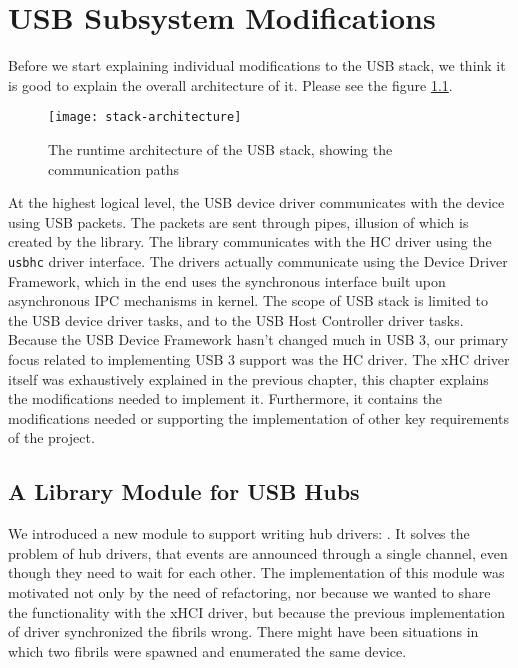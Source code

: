 \chapter{USB Subsystem Modifications}
\label{usb-refactoring}

Before we start explaining individual modifications to the USB stack, we think
it is good to explain the overall architecture of it. Please see the figure
\ref{fig:stack-architecture}.

\begin{figure}[h]
	\centering
	\texttt{[image: stack-architecture]}
	\caption{The runtime architecture of the USB stack, showing the communication paths}
	\label{fig:stack-architecture}
\end{figure}

At the highest logical level, the USB device driver communicates with the
device using USB packets. The packets are sent through pipes, illusion of which
is created by the  library. The library communicates with the HC
driver using the \texttt{usbhc} driver interface. The drivers actually
communicate using the Device Driver Framework, which in the end uses the
synchronous interface built upon asynchronous IPC mechanisms in kernel. The
scope of USB stack is limited to the USB device driver tasks, and to the USB
Host Controller driver tasks. Because the USB Device Framework hasn't changed much
in USB 3, our primary focus related to implementing USB 3 support was the HC
driver. The xHC driver itself was exhaustively explained in the previous
chapter, this chapter explains the modifications needed to implement it.
Furthermore, it contains the modifications needed or supporting the
implementation of other key requirements of the project.





\section{A Library Module for USB Hubs}
\label{hub-port-refactoring}

We introduced a new module to support writing hub drivers:
. It solves the problem of
hub drivers, that events are announced through a single channel, even though
they need to wait for each other. The implementation of this module was
motivated not only by the need of refactoring, nor because we wanted to share
the functionality with the xHCI driver, but because the previous implementation
of  driver synchronized the fibrils wrong. There might have been
situations in which two fibrils were spawned and enumerated the same device.

